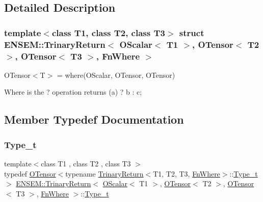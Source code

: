 \subsection{Detailed Description}
\subsubsection*{template$<$class T1, class T2, class T3$>$\newline
struct E\+N\+S\+E\+M\+::\+Trinary\+Return$<$ O\+Scalar$<$ T1 $>$, O\+Tensor$<$ T2 $>$, O\+Tensor$<$ T3 $>$, Fn\+Where $>$}

O\+Tensor$<$\+T$>$ = where(\+O\+Scalar, O\+Tensor, O\+Tensor) 

Where is the ? operation returns (a) ? b \+: c; 

\subsection{Member Typedef Documentation}
\mbox{\label{structENSEM_1_1TrinaryReturn_3_01OScalar_3_01T1_01_4_00_01OTensor_3_01T2_01_4_00_01OTensor_3_01T3_01_4_00_01FnWhere_01_4_a02a18159de516aef1fec4c120dcfd91d}} 
\subsubsection{\texorpdfstring{Type\_t}{Type\_t}\hspace{0.1cm}{\footnotesize\ttfamily [1/3]}}
{\footnotesize\ttfamily template$<$class T1 , class T2 , class T3 $>$ \\
typedef \mbox{\hyperlink{classENSEM_1_1OTensor}{O\+Tensor}}$<$typename \mbox{\hyperlink{structENSEM_1_1TrinaryReturn}{Trinary\+Return}}$<$T1, T2, T3, \mbox{\hyperlink{structENSEM_1_1FnWhere}{Fn\+Where}}$>$\+::\mbox{\hyperlink{structENSEM_1_1TrinaryReturn_3_01OScalar_3_01T1_01_4_00_01OTensor_3_01T2_01_4_00_01OTensor_3_01T3_01_4_00_01FnWhere_01_4_a02a18159de516aef1fec4c120dcfd91d}{Type\+\_\+t}}$>$ \mbox{\hyperlink{structENSEM_1_1TrinaryReturn}{E\+N\+S\+E\+M\+::\+Trinary\+Return}}$<$ \mbox{\hyperlink{classENSEM_1_1OScalar}{O\+Scalar}}$<$ T1 $>$, \mbox{\hyperlink{classENSEM_1_1OTensor}{O\+Tensor}}$<$ T2 $>$, \mbox{\hyperlink{classENSEM_1_1OTensor}{O\+Tensor}}$<$ T3 $>$, \mbox{\hyperlink{structENSEM_1_1FnWhere}{Fn\+Where}} $>$\+::\mbox{\hyperlink{structENSEM_1_1TrinaryReturn_3_01OScalar_3_01T1_01_4_00_01OTensor_3_01T2_01_4_00_01OTensor_3_01T3_01_4_00_01FnWhere_01_4_a02a18159de516aef1fec4c120dcfd91d}{Type\+\_\+t}}}

